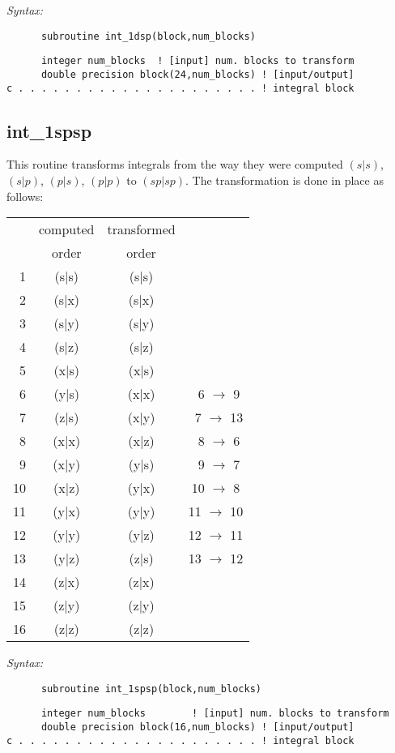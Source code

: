 {\it Syntax:} 
\begin{verbatim} 
      subroutine int_1dsp(block,num_blocks) 
\end{verbatim} 
\begin{verbatim} 
      integer num_blocks  ! [input] num. blocks to transform 
      double precision block(24,num_blocks) ! [input/output]  
c . . . . . . . . . . . . . . . . . . . . . ! integral block 
\end{verbatim} 
\subsection{int\_1spsp} 
This routine transforms integrals from the way they 
were computed $(s|s)$, $(s|p)$, $(p|s)$, $(p|p)$   
to $(sp|sp)$. 
The transformation is done in place as follows: 
\begin{tabular}{rccc}       
  &  computed & transformed   &   \\ 
  &   order   &  order  &   \\ 
~1 & (s|s)  &  (s|s)  &   \\ 
~2 & (s|x)  &  (s|x)  &   \\ 
~3 & (s|y)  &  (s|y)  &   \\ 
~4 & (s|z)  &  (s|z)  &   \\ 
~5 & (x|s)  &  (x|s)  &   \\ 
~6 & (y|s)  &  (x|x)  &  ~6 $\rightarrow$ 9\\ 
~7 & (z|s)  &  (x|y)  &  ~7 $\rightarrow$ 13\\ 
~8 & (x|x)  &  (x|z)  &  ~8 $\rightarrow$ 6\\ 
~9 & (x|y)  &  (y|s)  &  ~9 $\rightarrow$ 7\\ 
10 & (x|z)  &  (y|x)  &  10 $\rightarrow$ 8 \\  
11 & (y|x)  &  (y|y)  &  11 $\rightarrow$ 10\\ 
12 & (y|y)  &  (y|z)  &  12 $\rightarrow$ 11\\ 
13 & (y|z)  &  (z|s)  &  13 $\rightarrow$ 12\\ 
14 & (z|x)  &  (z|x)  &   \\ 
15 & (z|y)  &  (z|y)  &   \\ 
16 & (z|z)  &  (z|z)  &   \\ 
\end{tabular} 
 
{\it Syntax:} 
\begin{verbatim} 
      subroutine int_1spsp(block,num_blocks) 
\end{verbatim} 
\begin{verbatim} 
      integer num_blocks        ! [input] num. blocks to transform 
      double precision block(16,num_blocks) ! [input/output]  
c . . . . . . . . . . . . . . . . . . . . . ! integral block 
\end{verbatim} 
